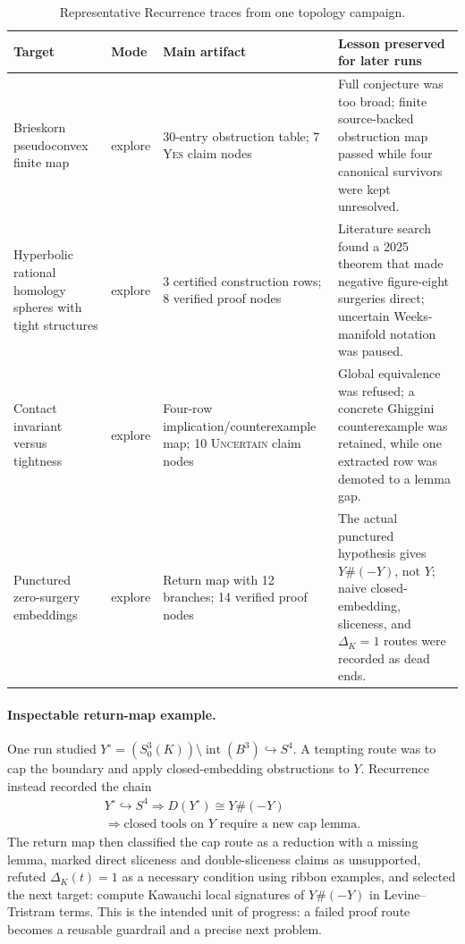 \documentclass{article}
\theoremstyle{definition}
\theoremstyle{remark}
\begin{document}
\begin{table}[t]
  \caption{Representative Recurrence traces from one topology campaign.}
  \label{tab:runs}
  \vskip 0.08in
  \centering
  \begin{small}
  \begin{tabular}{p{}p{}p{}p{}}
    \toprule
    Target & Mode & Main artifact & Lesson preserved for later runs \\
    \midrule
    Brieskorn pseudoconvex finite map & explore & 30-entry obstruction table; 7 \textsc{Yes} claim nodes & Full conjecture was too broad; finite source-backed obstruction map passed while four canonical survivors were kept unresolved. \\
    Hyperbolic rational homology spheres with tight structures & explore & 3 certified construction rows; 8 verified proof nodes & Literature search found a 2025 theorem that made negative figure-eight surgeries direct; uncertain Weeks-manifold notation was paused. \\
    Contact invariant versus tightness & explore & Four-row implication/counterexample map; 10 \textsc{Uncertain} claim nodes & Global equivalence was refused; a concrete Ghiggini counterexample was retained, while one extracted row was demoted to a lemma gap. \\
    Punctured zero-surgery embeddings & explore & Return map with 12 branches; 14 verified proof nodes & The actual punctured hypothesis gives \(Y\#(-Y)\), not \(Y\); naive closed-embedding, sliceness, and \(\Delta_K=1\) routes were recorded as dead ends. \\
    \bottomrule
  \end{tabular}
  \end{small}
\end{table}

\paragraph{Inspectable return-map example.}
One run studied \(Y^\circ=(S^3_0(K))\setminus\operatorname{int}(B^3)\hookrightarrow S^4\). A tempting route was to cap the boundary and apply closed-embedding obstructions to \(Y\). Recurrence instead recorded the chain
\[
\begin{gathered}
Y^\circ\hookrightarrow S^4
\Rightarrow D(Y^\circ)\cong Y\#(-Y)\\
\Rightarrow \text{closed tools on }Y
\text{ require a new cap lemma}.
\end{gathered}
\]
The return map then classified the cap route as a reduction with a missing lemma, marked direct sliceness and double-sliceness claims as unsupported, refuted \(\Delta_K(t)=1\) as a necessary condition using ribbon examples, and selected the next target: compute Kawauchi local signatures of \(Y\#(-Y)\) in Levine--Tristram terms. This is the intended unit of progress: a failed proof route becomes a reusable guardrail and a precise next problem.
\end{document}
